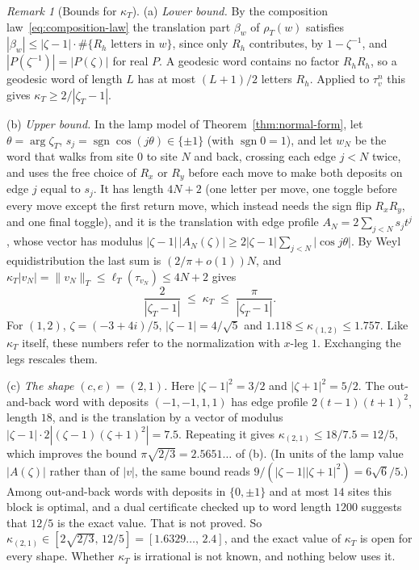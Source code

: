 \documentclass[11pt]{article}
\theoremstyle{plain}
\theoremstyle{definition}
\theoremstyle{remark}
\newtheorem{remark}[theorem]{Remark}
\begin{document}
\begin{remark}[Bounds for $\kappa_T$]
\label{rem:kappa}
(a) \emph{Lower bound.} By the composition law~\eqref{eq:composition-law} the
translation part $\beta_w$ of $\rho_T(w)$ satisfies
$|\beta_w|\le|\zeta-1|\cdot\#\{R_h\text{ letters in }w\}$, since only $R_h$
contributes, by $1-\zeta^{-1}$, and $|P(\zeta^{-1})|=|P(\zeta)|$ for real $P$. A
geodesic word contains no factor $R_hR_h$, so a geodesic word of length $L$
has at most $(L+1)/2$ letters $R_h$. Applied to $\tau_v^n$ this gives
$\kappa_T\ge2/|\zeta_T-1|$.

(b) \emph{Upper bound.} In the lamp model of Theorem~\ref{thm:normal-form}, let
$\theta=\arg\zeta_T$, $s_j=\operatorname{sgn}\cos(j\theta)\in\{\pm1\}$ (with
$\operatorname{sgn}0=1$), and let $w_N$ be the word that walks from site $0$ to
site $N$ and back, crossing each edge $j<N$ twice, and uses the free choice of
$R_x$ or $R_y$ before each move to make both deposits on edge $j$ equal to
$s_j$. It has length $4N+2$ (one letter per move, one toggle before every move
except the first return move, which instead needs the sign flip $R_xR_y$, and
one final toggle), and it is the translation with edge profile
$A_N=2\sum_{j<N}s_jt^j$, whose vector has modulus
$|\zeta-1|\,|A_N(\zeta)|\ge2|\zeta-1|\sum_{j<N}|\cos j\theta|$. By Weyl
equidistribution the last sum is $(2/\pi+o(1))N$, and
$\kappa_T|v_N|=\|v_N\|_T\le\ell_T(\tau_{v_N})\le4N+2$ gives
\[
  \frac{2}{|\zeta_T-1|}\;\le\;\kappa_T\;\le\;\frac{\pi}{|\zeta_T-1|}.
\]
For $(1,2)$, $\zeta=(-3+4i)/5$, $|\zeta-1|=4/\sqrt5$ and
$1.118\le\kappa_{(1,2)}\le1.757$. Like $\kappa_T$ itself, these numbers refer to the
normalization with $x$-leg $1$. Exchanging the legs rescales them.

(c) \emph{The shape $(c,e)=(2,1)$.} Here $|\zeta-1|^2=3/2$ and
$|\zeta+1|^2=5/2$. The out-and-back word with deposits $(-1,-1,1,1)$ has edge
profile $2(t-1)(t+1)^2$, length $18$, and is the translation by a vector of
modulus $|\zeta-1|\cdot2|(\zeta-1)(\zeta+1)^2|=7.5$. Repeating it gives
$\kappa_{(2,1)}\le18/7.5=12/5$, which improves the bound $\pi\sqrt{2/3}=2.5651\ldots$
of (b). (In units of the lamp value $|A(\zeta)|$ rather than of $|v|$, the same
bound reads $9/(|\zeta-1||\zeta+1|^2)=6\sqrt6/5$.) Among out-and-back words with
deposits in $\{0,\pm1\}$ and at most $14$ sites this block is optimal, and a dual
certificate checked up to word length $1200$ suggests that $12/5$ is the exact value.
That is not proved. So $\kappa_{(2,1)}\in[2\sqrt{2/3},\,12/5]=[1.6329\ldots,\,2.4]$,
and the exact value of $\kappa_T$ is open for every shape.
Whether $\kappa_T$ is irrational is not known, and nothing below uses it.
\end{remark}
\end{document}
